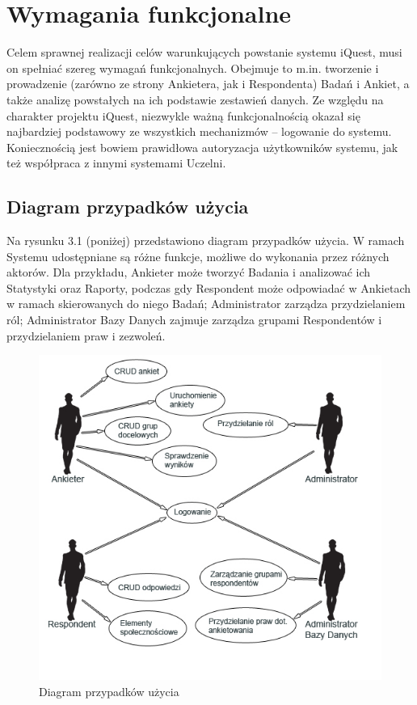 \chapter{Wymagania funkcjonalne}
\label{Chapter3}

Celem sprawnej realizacji celów warunkujących powstanie systemu iQuest, musi on spełniać szereg wymagań funkcjonalnych. Obejmuje to m.in. tworzenie i prowadzenie (zarówno ze strony Ankietera, jak i Respondenta) Badań i Ankiet, a także analizę powstałych na ich podstawie zestawień danych. Ze względu na charakter projektu iQuest, niezwykle ważną funkcjonalnością okazał się najbardziej podstawowy ze wszystkich mechanizmów -- logowanie do systemu. Koniecznością jest bowiem prawidłowa autoryzacja użytkowników systemu, jak też współpraca z innymi systemami Uczelni.

\section{Diagram przypadków użycia}
\label{Chapter31}

Na rysunku 3.1 (poniżej) przedstawiono diagram przypadków użycia. W ramach Systemu udostępniane są różne funkcje, możliwe do wykonania przez różnych aktorów. Dla przykładu, Ankieter może tworzyć Badania i analizować ich Statystyki oraz Raporty, podczas gdy Respondent może odpowiadać w Ankietach w ramach skierowanych do niego Badań; Administrator zarządza przydzielaniem ról; Administrator Bazy Danych zajmuje zarządza grupami Respondentów i przydzielaniem praw i zezwoleń.

\begin{figure}[H]
\centering\includegraphics[width=15cm]{figures/UseCaseView}
\caption{Diagram przypadków użycia}\label{rys:usecase}
\end{figure}

